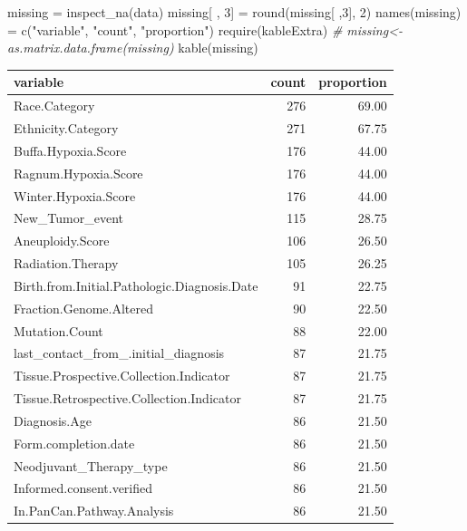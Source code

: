 \documentclass[
  11pt,
]{article}
\newenvironment{Shaded}{\begin{snugshade}}{\end{snugshade}}
\newcommand{\CommentTok}[1]{\textcolor[rgb]{0.56,0.35,0.01}{\textit{#1}}}
\newcommand{\DecValTok}[1]{\textcolor[rgb]{0.00,0.00,0.81}{#1}}
\newcommand{\FunctionTok}[1]{\textcolor[rgb]{0.00,0.00,0.00}{#1}}
\newcommand{\NormalTok}[1]{#1}
\newcommand{\OtherTok}[1]{\textcolor[rgb]{0.56,0.35,0.01}{#1}}
\newcommand{\StringTok}[1]{\textcolor[rgb]{0.31,0.60,0.02}{#1}}
\begin{document}
\begin{Shaded}
\begin{Highlighting}[]
\NormalTok{missing }\OtherTok{=} \FunctionTok{inspect\_na}\NormalTok{(data)}
\NormalTok{missing[ , }\DecValTok{3}\NormalTok{] }\OtherTok{=} \FunctionTok{round}\NormalTok{(missing[ ,}\DecValTok{3}\NormalTok{], }\DecValTok{2}\NormalTok{)}
\FunctionTok{names}\NormalTok{(missing) }\OtherTok{=} \FunctionTok{c}\NormalTok{(}\StringTok{"variable"}\NormalTok{, }\StringTok{"count"}\NormalTok{, }\StringTok{"proportion"}\NormalTok{)}
\FunctionTok{require}\NormalTok{(kableExtra)}
\CommentTok{\# missing\textless{}{-}as.matrix.data.frame(missing)}
\FunctionTok{kable}\NormalTok{(missing)}
\end{Highlighting}
\end{Shaded}

\begin{tabular}{l|r|r}
\hline
variable & count & proportion\\
\hline
Race.Category & 276 & 69.00\\
\hline
Ethnicity.Category & 271 & 67.75\\
\hline
Buffa.Hypoxia.Score & 176 & 44.00\\
\hline
Ragnum.Hypoxia.Score & 176 & 44.00\\
\hline
Winter.Hypoxia.Score & 176 & 44.00\\
\hline
New\_Tumor\_event & 115 & 28.75\\
\hline
Aneuploidy.Score & 106 & 26.50\\
\hline
Radiation.Therapy & 105 & 26.25\\
\hline
Birth.from.Initial.Pathologic.Diagnosis.Date & 91 & 22.75\\
\hline
Fraction.Genome.Altered & 90 & 22.50\\
\hline
Mutation.Count & 88 & 22.00\\
\hline
last\_contact\_from\_.initial\_diagnosis & 87 & 21.75\\
\hline
Tissue.Prospective.Collection.Indicator & 87 & 21.75\\
\hline
Tissue.Retrospective.Collection.Indicator & 87 & 21.75\\
\hline
Diagnosis.Age & 86 & 21.50\\
\hline
Form.completion.date & 86 & 21.50\\
\hline
Neodjuvant\_Therapy\_type & 86 & 21.50\\
\hline
Informed.consent.verified & 86 & 21.50\\
\hline
In.PanCan.Pathway.Analysis & 86 & 21.50\\

\end{tabular}
\end{document}
